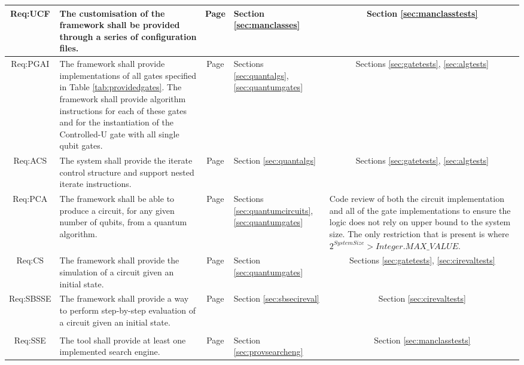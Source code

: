\begin{landscape}
\begin{longtable}{|c|m{10cm}|c|m{4cm}|m{4cm}|}
Req:UCF &
The customisation of the framework shall be provided through a series of configuration files. &
Page \pageref{sec:requcf} &
Section \ref{sec:manclasses} &
\multicolumn{1}{c|}{Section \ref{sec:manclasstests}} \\ \hline

Req:PGAI &
The framework shall provide implementations of all gates specified in Table \ref{tab:providedgates}. The framework shall provide algorithm instructions for each of these gates and for the instantiation of the Controlled-U gate with all single qubit gates. &
Page \pageref{sec:reqpgai} &
Sections \ref{sec:quantalgs}, \ref{sec:quantumgates} &
\multicolumn{1}{c|}{Sections \ref{sec:gatetests}, \ref{sec:algtests}} \\ \hline

Req:ACS &
The system shall provide the iterate control structure and support nested iterate instructions. &
Page \pageref{sec:reqacs} &
Section \ref{sec:quantalgs} &
\multicolumn{1}{c|}{Sections \ref{sec:gatetests}, \ref{sec:algtests}} \\ \hline

Req:PCA &
The framework shall be able to produce a circuit, for any given number of qubits, from a quantum algorithm. &
Page \pageref{sec:reqpca} &
Sections \ref{sec:quantumcircuits}, \ref{sec:quantumgates} &
Code review of both the circuit implementation and all of the gate implementations to ensure the logic does not rely on upper bound to the system size.
The only restriction that is present is where $2^{System Size}>Integer.MAX\_VALUE$. \\ \hline

Req:CS &
The framework shall provide the simulation of a circuit given an initial state. &
Page \pageref{sec:reqcs} &
Section \ref{sec:quantumgates} &
\multicolumn{1}{c|}{Sections \ref{sec:gatetests}, \ref{sec:cirevaltests}} \\ \hline

Req:SBSSE &
The framework shall provide a way to perform step-by-step evaluation of a circuit given an initial state. &
Page \pageref{sec:reqsbsse} &
Section \ref{sec:sbsecireval} &
\multicolumn{1}{c|}{Section \ref{sec:cirevaltests}} \\ \hline

&&&&
\\ \hline

Req:SSE &
The tool shall provide at least one implemented search engine. &
Page \pageref{sec:reqsse} &
Section \ref{sec:provsearcheng} &
\multicolumn{1}{c|}{Section \ref{sec:manclasstests}} \\ \hline


\end{longtable}
\end{landscape}
